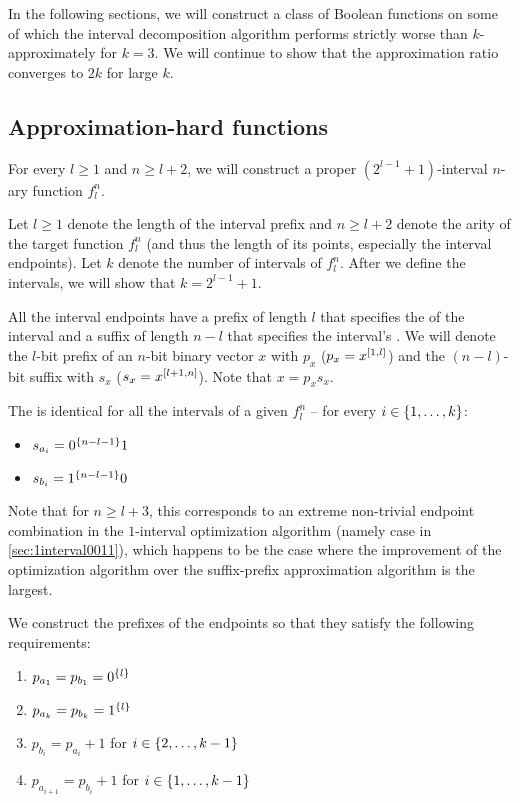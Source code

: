 In the following sections,
we will construct a class of Boolean functions
on some of which
the interval decomposition algorithm
performs strictly worse than $k$-approximately
for $k = 3$.
We will continue to show
that the approximation ratio converges to $2k$
for large $k$.

\subsection{Approximation-hard functions}

For every $l \geq 1$ and $n \geq l+2$,
we will construct
a proper $(2^{l-1} + 1)$-interval $n$-ary function $f_l^n$.

Let $l \geq 1$
denote the length of the interval  prefix
and $n \geq l+2$
denote the arity of the target function $f_l^n$
(and thus the length of its points,
especially the interval endpoints).
Let $k$ denote the number of intervals of $f_l^n$.
After we define the intervals,
we will show that $k = 2^{l-1} + 1$.

All the interval endpoints have a prefix of length $l$
that specifies the  of the interval
and a suffix of length $n - l$
that specifies the interval's .
We will denote the $l$-bit  prefix
of an $n$-bit binary vector $x$ with $p_x$
($p_x = x^{[1, l]}$)
and the $(n-l)$-bit  suffix with $s_x$
($s_x = x^{[l+1, n]}$).
Note that $x = p_x s_x$.

The  is identical for all the intervals
of a given $f_l^n$
-- for every $i \in \{1, \ldots, k\}$:

\begin{itemize}
\item $s_{a_i} = 0^{\{n-l-1\}} 1$
\item $s_{b_i} = 1^{\{n-l-1\}} 0$
\end{itemize}

Note that for $n \geq l + 3$,
this  corresponds to an extreme
non-trivial endpoint combination in the $1$-interval
optimization algorithm
(namely case 
in \autoref{sec:1interval0011}),
which happens to be the case where the improvement
of the optimization algorithm
over the suffix-prefix approximation algorithm
is the largest.

We construct the  prefixes of the endpoints
so that they
satisfy the following requirements:

\begin{enumerate}
\item \label{item:hardint1}
$p_{a_1} = p_{b_1} = 0^{\{l\}}$
\item \label{item:hardintk}
$p_{a_k} = p_{b_k} = 1^{\{l\}}$
\item \label{item:hardlength}
$p_{b_i} = p_{a_i} + 1$
for $i \in \{2, \ldots, k-1\}$
\item \label{item:hardspacing}
$p_{a_{i+1}} = p_{b_i} + 1$
for $i \in \{1, \ldots, k-1\}$
\end{enumerate}

